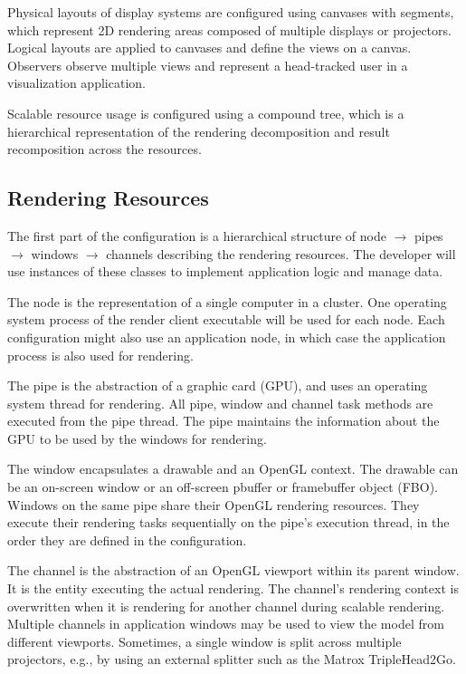 Physical layouts of display systems are configured using canvases with
segments, which represent 2D rendering areas composed of multiple displays or
projectors. Logical layouts are applied to canvases and define the views on a
canvas. Observers observe multiple views and represent a head-tracked user in a
visualization application.

Scalable resource usage is configured using a compound tree, which is a
hierarchical representation of the rendering decomposition and result
recomposition across the resources.

\subsection{Rendering Resources}

The first part of the configuration is a hierarchical structure of node
$\rightarrow$ pipes $\rightarrow$ win\-dows $\rightarrow$ channels describing
the rendering resources. The developer will use instances of these classes to
implement application logic and manage data.

The \textsf{node} is the representation of a single computer in a cluster. One operating
system process of the render client executable will be used for each node. Each
configuration might also use an application node, in which case the application
process is also used for rendering.

The \textsf{pipe} is the abstraction of a graphic card (GPU), and uses an
operating system thread for rendering. All pipe, window and channel task methods
are executed from the pipe thread. The pipe maintains the information about the
GPU to be used by the windows for rendering.

The \textsf{window} encapsulates a drawable and an OpenGL context. The drawable
can be an on-screen window or an off-screen pbuffer or framebuffer object
(FBO). Windows on the same pipe share their OpenGL rendering resources. They
execute their rendering tasks sequentially on the pipe's execution thread, in
the order they are defined in the configuration.

The \textsf{channel} is the abstraction of an OpenGL viewport within its parent
window. It is the entity executing the actual rendering. The channel's
rendering context is overwritten when it is rendering for another channel
during scalable rendering. Multiple channels in application windows may be used
to view the model from different viewports. Sometimes, a single window is split
across multiple projectors, e.g., by using an external splitter such as the
Matrox TripleHead2Go.


